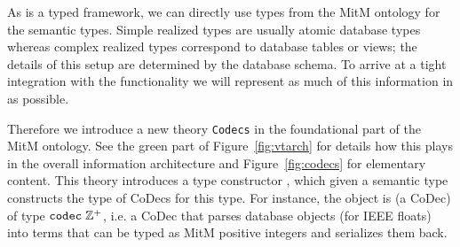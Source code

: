 As \ommt is a typed framework, we can directly use \ommt types from the MitM ontology for the semantic types. 
Simple realized types are usually atomic database types whereas complex realized types correspond to database tables or views; the details of this setup are determined by the database schema. 
To arrive at a tight integration with the \ommt functionality we will represent as much of this information in \ommt as possible.

Therefore we introduce a new \ommt theory \texttt{Codecs} in the foundational part of the MitM ontology.  
See the green part of Figure~\ref{fig:vtarch} for details how this plays in the overall information architecture and Figure~\ref{fig:codecs} for elementary content. 
This theory introduces a type constructor \codectt, which given a semantic type constructs the type of CoDecs for this type. 
For instance, the object  is (a CoDec) of type $\codectt\;\mathbb{Z}^+$, i.e. a CoDec that parses database objects (for \lmfdb IEEE floats) into \ommt terms that can be typed as MitM positive integers and serializes them back.

